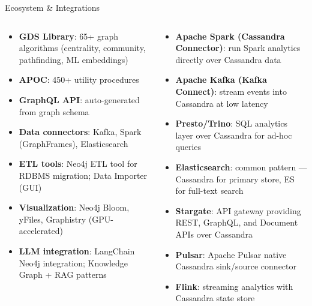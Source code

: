 \documentclass[aspectratio=169]{beamer}
\begin{document}
\begin{frame}{Ecosystem \& Integrations}
  \begin{columns}[T]
      \begin{tcolorbox}[neo4jbox, title=Neo4j Ecosystem]
        \scriptsize
        \begin{itemize}
          \item \textbf{GDS Library}: 65+ graph algorithms (centrality, community, pathfinding, ML embeddings)
          \item \textbf{APOC}: 450+ utility procedures
          \item \textbf{GraphQL API}: auto-generated from graph schema
          \item \textbf{Data connectors}: Kafka, Spark (GraphFrames), Elasticsearch
          \item \textbf{ETL tools}: Neo4j ETL tool for RDBMS migration; Data Importer (GUI)
          \item \textbf{Visualization}: Neo4j Bloom, yFiles, Graphistry (GPU-accelerated)
          \item \textbf{LLM integration}: LangChain Neo4j integration; Knowledge Graph + RAG patterns
        \end{itemize}
      \end{tcolorbox}
      \begin{tcolorbox}[cassbox, title=Cassandra Ecosystem]
        \scriptsize
        \begin{itemize}
          \item \textbf{Apache Spark (Cassandra Connector)}: run Spark analytics directly over Cassandra data
          \item \textbf{Apache Kafka (Kafka Connect)}: stream events into Cassandra at low latency
          \item \textbf{Presto/Trino}: SQL analytics layer over Cassandra for ad-hoc queries
          \item \textbf{Elasticsearch}: common pattern — Cassandra for primary store, ES for full-text search
          \item \textbf{Stargate}: API gateway providing REST, GraphQL, and Document APIs over Cassandra
          \item \textbf{Pulsar}: Apache Pulsar native Cassandra sink/source connector
          \item \textbf{Flink}: streaming analytics with Cassandra state store
        \end{itemize}
      \end{tcolorbox}
  \end{columns}
\end{frame}
\end{document}

